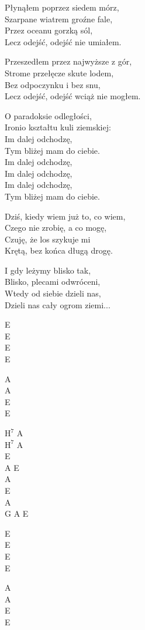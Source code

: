 \begin{text}
    Płynąłem poprzez siedem mórz,\\
    Szarpane wiatrem groźne fale,\\
    Przez oceanu gorzką sól,\\
    Lecz odejść, odejść nie umiałem.

    Przeszedłem przez najwyższe z gór,\\
    Strome przełęcze skute lodem,\\
    Bez odpoczynku i bez snu,\\
    Lecz odejść, odejść wciąż nie mogłem.

    O paradoksie odległości,\\
    Ironio kształtu kuli ziemskiej:\\
    Im dalej odchodzę,\\
    Tym bliżej mam do ciebie.\\
    Im dalej odchodzę,\\
    Im dalej odchodzę,\\
    Im dalej odchodzę,\\
    Tym bliżej mam do ciebie.

    Dziś, kiedy wiem już to, co wiem,\\
    Czego nie zrobię, a co mogę,\\
    Czuję, że los szykuje mi\\
    Krętą, bez końca długą drogę.

    I gdy leżymy blisko tak,\\
    Blisko, plecami odwróceni,\\
    Wtedy od siebie dzieli nas,\\
    Dzieli nas cały ogrom ziemi...
\end{text}
\begin{chord}
    E\\
    E\\
    E\\
    E

    A\\
    A\\
    E\\
    E

    $\mathrm{H^7}$ A\\
    $\mathrm{H^7}$ A\\
    E\\
    A E\\
    A\\
    E\\
    A\\
    G A E

    E\\
    E\\
    E\\
    E

    A\\
    A\\
    E\\
    E
\end{chord}
